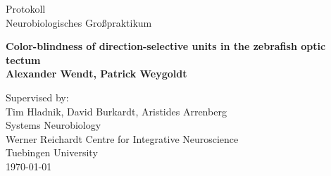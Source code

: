 \begin{titlepage}
\begin{center}

\vspace*{0.5cm}
\Large
Protokoll\\
Neurobiologisches Großpraktikum\\
\vspace{1cm}

\Huge
\textbf{Color-blindness of direction-selective units in the zebrafish optic tectum}\\
\Large
\vspace{1cm}
\textbf{Alexander Wendt, Patrick Weygoldt}
\vspace{1cm}

\vfill

\large
\vspace{0.5cm}
Supervised by:\\
\vspace{0.5cm}
Tim Hladnik, David Burkardt, Aristides Arrenberg\\
Systems Neurobiology\\
Werner Reichardt Centre for
Integrative Neuroscience \\
Tuebingen University\\
\vspace{1cm}
\today \\
\vspace{0.5cm}

        
\end{center}
\end{titlepage}
